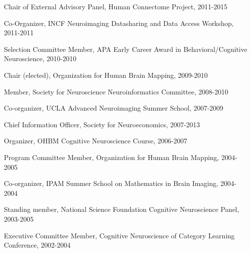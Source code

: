 Chair of External Advisory Panel, Human Connectome Project, 2011-2015 

Co-Organizer,  INCF Neuroimaging Datasharing and Data Access Workshop, 2011-2011 

Selection Committee Member, APA Early Career Award in Behavioral/Cognitive Neuroscience, 2010-2010 

Chair (elected), Organization for Human Brain Mapping, 2009-2010 

Member, Society for Neuroscience Neuroinformatics Committee, 2008-2010 

Co-organizer, UCLA Advanced Neuroimaging Summer School, 2007-2009 

Chief Information Officer, Society for Neuroeconomics, 2007-2013 

Organizer, OHBM Cognitive Neuroscience Course, 2006-2007 

Program Committee Member, Organization for Human Brain Mapping, 2004-2005 

Co-organizer, IPAM Summer School on Mathematics in Brain Imaging, 2004-2004 

Standing member, National Science Foundation Cognitive Neuroscience Panel, 2003-2005 

Executive Committee Member, Cognitive Neuroscience of Category Learning Conference, 2002-2004 

